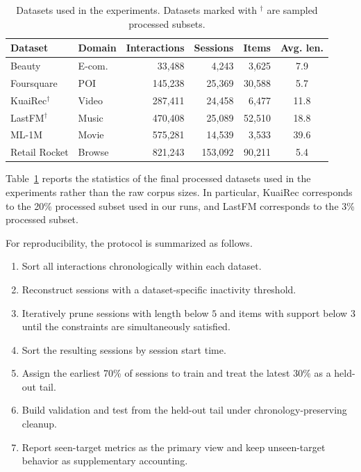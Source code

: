 \documentclass[sigconf,review,anonymous]{acmart}
\begin{document}
\begin{table}[H]
  \caption{Datasets used in the experiments. Datasets marked with $^\dagger$ are sampled processed subsets.}
  \label{tab:appendix-datasets}
  \centering
  \footnotesize
  \setlength{\tabcolsep}{3.0pt}
  \begin{tabular*}{\columnwidth}{@{\extracolsep{\fill}}llrrrc@{}}
    \toprule
    Dataset & Domain & Interactions & Sessions & Items & Avg. len. \\
    \midrule
    Beauty & E-com. & 33,488 & 4,243 & 3,625 & 7.9 \\
    Foursquare & POI & 145,238 & 25,369 & 30,588 & 5.7 \\
    KuaiRec$^\dagger$ & Video & 287,411 & 24,458 & 6,477 & 11.8 \\
    LastFM$^\dagger$ & Music & 470,408 & 25,089 & 52,510 & 18.8 \\
    ML-1M & Movie & 575,281 & 14,539 & 3,533 & 39.6 \\
    Retail Rocket & Browse & 821,243 & 153,092 & 90,211 & 5.4 \\
    \bottomrule
  \end{tabular*}
\end{table}

Table~\ref{tab:appendix-datasets} reports the statistics of the final processed datasets used in the experiments rather than the raw corpus sizes. In particular, KuaiRec corresponds to the 20\% processed subset used in our runs, and LastFM corresponds to the 3\% processed subset.

For reproducibility, the protocol is summarized as follows.
\begin{enumerate}
  \item Sort all interactions chronologically within each dataset.
  \item Reconstruct sessions with a dataset-specific inactivity threshold.
  \item Iteratively prune sessions with length below $5$ and items with support below $3$ until the constraints are simultaneously satisfied.
  \item Sort the resulting sessions by session start time.
  \item Assign the earliest 70\% of sessions to train and treat the latest 30\% as a held-out tail.
  \item Build validation and test from the held-out tail under chronology-preserving cleanup.
  \item Report seen-target metrics as the primary view and keep unseen-target behavior as supplementary accounting.
\end{enumerate}
\end{document}

